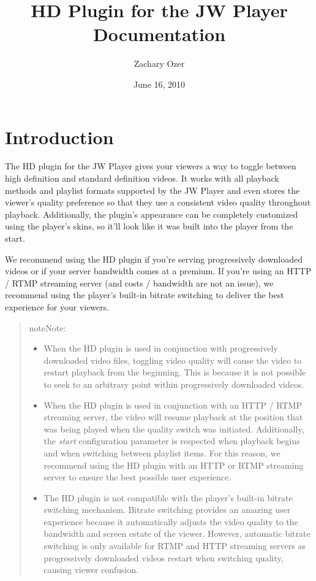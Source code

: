 \documentclass[letterpaper,10pt,english]{sphinxmanual}
\title{HD Plugin for the JW Player Documentation}
\date{June 16, 2010}
\author{Zachary Ozer}
\begin{document}
\maketitle
\tableofcontents
{}\label{index::doc}



\chapter{Introduction}
\label{index:introduction}\label{index:overview}\label{index:hd-plugin-for-the-jw-player}
The HD plugin for the JW Player gives your viewers a way to toggle between high definition and standard definition videos. It works with all playback methods and playlist formats supported by the JW Player and even stores the viewer's quality preference so that they use a consistent video quality throughout playback. Additionally, the plugin's appearance can be completely customized using the player's skins, so it'll look like it was built into the player from the start.

We recommend using the HD plugin if you're serving progressively downloaded videos or if your server bandwidth comes at a premium. If you're using an HTTP / RTMP streaming server (and costs / bandwidth are not an issue),  we recommend using the player's built-in bitrate switching to deliver the best experience for your viewers.
\begin{quote}

\begin{notice}{note}{Note:}\begin{itemize}
\item {} 
When the HD plugin is used in conjunction with progressively downloaded video files, toggling video quality will cause the video to restart playback from the beginning. This is because it is not possible to seek to an arbitrary point within progressively downloaded videos.

\item {} 
When the HD plugin is used in conjunction with an HTTP / RTMP streaming server, the video will resume playback at the position that was being played when the quality switch was initiated. Additionally, the \emph{start} configuration parameter is respected when playback begins and when switching between playlist items. For this reason, we recommend using the HD plugin with an HTTP or RTMP streaming server to ensure the best possible user experience.

\item {} 
The HD plugin is not compatible with the player's built-in bitrate switching mechanism. Bitrate switching provides an amazing user experience because it automatically adjusts the video quality to the bandwidth and screen estate of the viewer. However, automatic bitrate switching is only available for RTMP and HTTP streaming servers as progressively downloaded videos restart when switching quality, causing viewer confusion.

\end{itemize}
\end{notice}
\end{quote}
\end{document}
